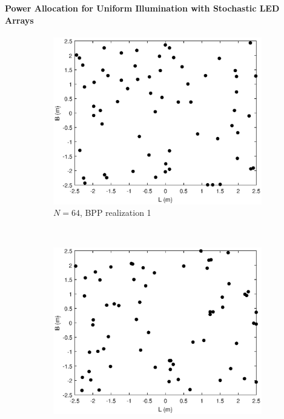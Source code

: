 \documentclass[slidestop,usepdftitle=false]{gvvslides}
\begin{document}
\begin{frame}
\frametitle{\,}
\framesubtitle{Power Allocation for Uniform Illumination with
Stochastic LED Arrays}
\begin{figure}[h!]
    \centering
    \begin{subfigure}[t]{0.5\columnwidth}
        \centering
        \includegraphics[scale=.2]{LEDRealization1}
        \caption{$N=64$, BPP realization 1}
\label{fig:two_realize:led1}        
    \end{subfigure}%
    ~ 
    \begin{subfigure}[t]{0.5\columnwidth}
        \centering
        \includegraphics[scale=.2]{LEDRealization2}

\end{subfigure}
\end{figure}
\end{frame}
\end{document}
